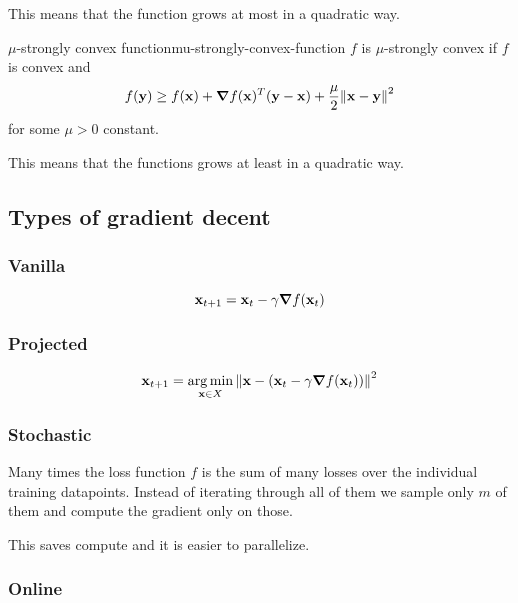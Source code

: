 \documentclass[12pt]{extarticle}
\renewcommand{\vec}[1]{\bvec{#1}}
\numberwithin{equation}{subsection}
\begin{document}
This means that the function grows at most in a quadratic way.

\begin{definition}{$\mu$-strongly convex function}{mu-strongly-convex-function}
	$f$ is $\mu$-strongly convex if $f$ is convex and
	\begin{equation}
		f(\vec y) \geq f(\vec x) + \grad f(\vec x)^T (\vec y - \vec x) + \frac{\mu}{2} \norm{\vec x - \vec y}^2
	\end{equation}
	for some $\mu > 0$ constant.
\end{definition}
This means that the functions grows at least in a quadratic way.

\subsection{Types of gradient decent}

\subsubsection{Vanilla}

\begin{equation}
	\vec x_{t+1} = \vec x_t - \gamma \grad f(\vec x_t)
\end{equation}

\subsubsection{Projected}

\begin{equation}
	\vec x_{t+1} = \argmin_{\vec x \in X}\norm{ \vec x - (\vec x_t - \gamma \grad f(\vec x_t)) }^2
\end{equation}

\subsubsection{Stochastic}

Many times the loss function $f$ is the sum of many losses over the individual training datapoints.
Instead of iterating through all of them we sample only $m$ of them and compute the gradient only on
those.

This saves compute and it is easier to parallelize.

\subsubsection{Online}
\end{document}
